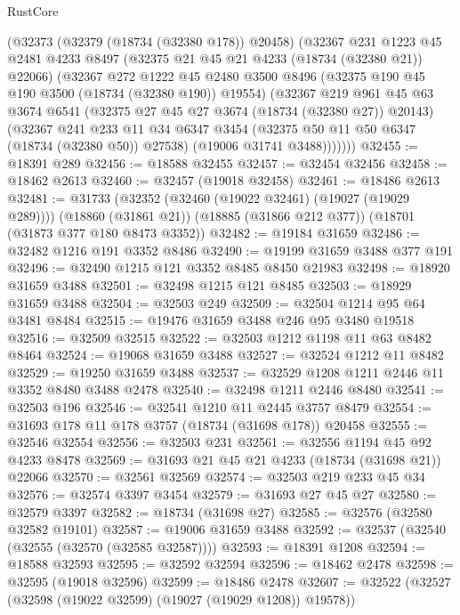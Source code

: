 \begin{lexlean}{RustCore}
\begin{coremodule}
      (@32373
        (@32379 (@18734 (@32380 @178)) @20458)
        (@32367
          @231
          @1223
          @45
          @2481
          @4233
          @8497
          (@32375 @21 @45 @21 @4233 (@18734 (@32380 @21)) @22066)
          (@32367
            @272
            @1222
            @45
            @2480
            @3500
            @8496
            (@32375 @190 @45 @190 @3500 (@18734 (@32380 @190)) @19554)
            (@32367
              @219
              @961
              @45
              @63
              @3674
              @6541
              (@32375 @27 @45 @27 @3674 (@18734 (@32380 @27)) @20143)
              (@32367
                @241
                @233
                @11
                @34
                @6347
                @3454
                (@32375 @50 @11 @50 @6347 (@18734 (@32380 @50)) @27538)
                (@19006 @31741 @3488)))))))
@32455 := @18391 @289
@32456 := @18588 @32455
@32457 := @32454 @32456
@32458 := @18462 @2613
@32460 := @32457 (@19018 @32458)
@32461 := @18486 @2613
@32481 := @31733
    (@32352 (@32460 (@19022 @32461) (@19027 (@19029 @289))))
    (@18860 (@31861 @21))
    (@18885 (@31866 @212 @377))
    (@18701 (@31873 @377 @180 @8473 @3352))
@32482 := @19184 @31659
@32486 := @32482 @1216 @191 @3352 @8486
@32490 := @19199 @31659 @3488 @377 @191
@32496 := @32490 @1215 @121 @3352 @8485 @8450 @21983
@32498 := @18920 @31659 @3488
@32501 := @32498 @1215 @121 @8485
@32503 := @18929 @31659 @3488
@32504 := @32503 @249
@32509 := @32504 @1214 @95 @64 @3481 @8484
@32515 := @19476 @31659 @3488 @246 @95 @3480 @19518
@32516 := @32509 @32515
@32522 := @32503 @1212 @1198 @11 @63 @8482 @8464
@32524 := @19068 @31659 @3488
@32527 := @32524 @1212 @11 @8482
@32529 := @19250 @31659 @3488
@32537 := @32529 @1208 @1211 @2446 @11 @3352 @8480 @3488 @2478
@32540 := @32498 @1211 @2446 @8480
@32541 := @32503 @196
@32546 := @32541 @1210 @11 @2445 @3757 @8479
@32554 := @31693 @178 @11 @178 @3757 (@18734 (@31698 @178)) @20458
@32555 := @32546 @32554
@32556 := @32503 @231
@32561 := @32556 @1194 @45 @92 @4233 @8478
@32569 := @31693 @21 @45 @21 @4233 (@18734 (@31698 @21)) @22066
@32570 := @32561 @32569
@32574 := @32503 @219 @233 @45 @34
@32576 := @32574 @3397 @3454
@32579 := @31693 @27 @45 @27
@32580 := @32579 @3397
@32582 := @18734 (@31698 @27)
@32585 := @32576 (@32580 @32582 @19101)
@32587 := @19006 @31659 @3488
@32592 := @32537 (@32540 (@32555 (@32570 (@32585 @32587))))
@32593 := @18391 @1208
@32594 := @18588 @32593
@32595 := @32592 @32594
@32596 := @18462 @2478
@32598 := @32595 (@19018 @32596)
@32599 := @18486 @2478
@32607 := @32522 (@32527 (@32598 (@19022 @32599) (@19027 (@19029 @1208)) @19578))

\end{coremodule}
\end{lexlean}
